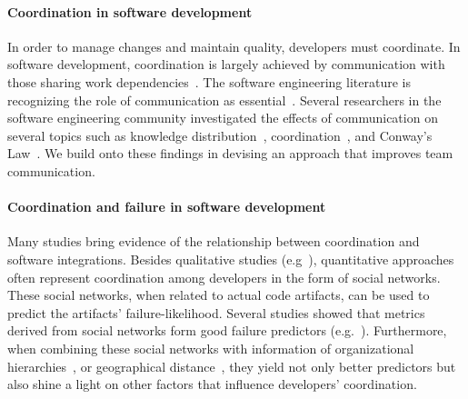 \paragraph{Coordination in software development}
In order to manage changes and maintain quality, developers must coordinate. In
software development, coordination is largely achieved by communication with those sharing work dependencies~\cite{kraut1995:coordination}. 
The software engineering literature is recognizing the role of communication as essential~\cite{nakakoji2010:rdc}.
Several researchers in the software engineering community investigated the effects of communication on several topics such as knowledge distribution~\cite{ehrlich:icgse:2006}, coordination~\cite{hinds:cscw:2006}, and Conway's Law~\cite{cataldo:cscw:2006}.
We build onto these findings in devising an approach that improves team communication.


\paragraph{Coordination and failure in software development}
Many studies bring evidence of the relationship between coordination and software integrations. Besides qualitative studies (e.g~\cite{herbsleb:icse:1999}), quantitative approaches often represent coordination among developers in the form of social networks. These social networks, when related to actual code artifacts, can be used to predict the artifacts' failure-likelihood.
Several studies showed that metrics derived from social networks form good failure predictors (e.g.~\cite{meneely:fse:2008}).
Furthermore, when combining these social networks with information of organizational hierarchies~\cite{nagappan:icse:2008}, or geographical distance~\cite{bird:acm:2009}, they yield not only better predictors but also shine a light on other factors that influence developers' coordination.

